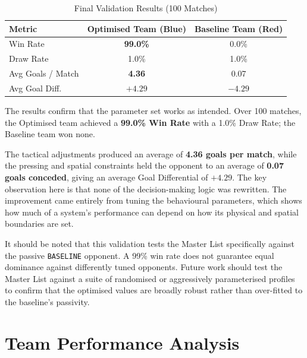 \documentclass[12pt, a4paper]{report}
\begin{document}
\begin{table}[h]
  \centering
  \caption{Final Validation Results (100 Matches)}
  \label{tab:validation}
  \begin{tabular}{lcc}
    \toprule
    \textbf{Metric} & \textbf{Optimised Team (Blue)}
      & \textbf{Baseline Team (Red)} \\
    \midrule
    Win Rate          & \textbf{99.0\%}  & 0.0\%   \\
    Draw Rate         & 1.0\%            & 1.0\%   \\
    Avg Goals / Match & \textbf{4.36}    & 0.07    \\
    Avg Goal Diff.    & \textbf{$+4.29$} & $-4.29$ \\
    \bottomrule
  \end{tabular}
\end{table}

The results confirm that the parameter set works as intended.
Over 100 matches, the Optimised team achieved a \textbf{99.0\% Win Rate}
with a 1.0\% Draw Rate; the Baseline team won none.

The tactical adjustments produced an average of \textbf{4.36 goals per
match}, while the pressing and spatial constraints held the opponent to an
average of \textbf{0.07 goals conceded}, giving an average Goal
Differential of $+4.29$.
The key observation here is that none of the decision-making logic was
rewritten. The improvement came entirely from tuning the behavioural
parameters, which shows how much of a system's performance can depend on
how its physical and spatial boundaries are set.

It should be noted that this validation tests the Master List specifically
against the passive \texttt{BASELINE} opponent.
A 99\% win rate does not guarantee equal dominance against differently
tuned opponents.
Future work should test the Master List against a suite of randomised or
aggressively parameterised profiles to confirm that the optimised values
are broadly robust rather than over-fitted to the baseline's passivity.


\chapter{Team Performance Analysis}

\end{document}
